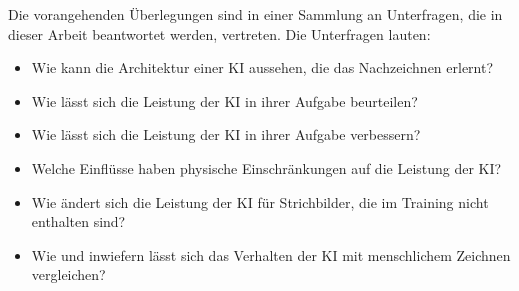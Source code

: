 Die vorangehenden Überlegungen sind in einer Sammlung an Unterfragen, die in
dieser Arbeit beantwortet werden, vertreten. Die Unterfragen lauten:
\begin{itemize}
    \item Wie kann die Architektur einer KI aussehen, die das Nachzeichnen erlernt?
    \item Wie lässt sich die Leistung der KI in ihrer Aufgabe beurteilen?
    \item Wie lässt sich die Leistung der KI in ihrer Aufgabe verbessern?
    \item Welche Einflüsse haben physische Einschränkungen auf die Leistung der KI?
    \item Wie ändert sich die Leistung der KI für Strichbilder, die im Training nicht enthalten sind?
    \item Wie und inwiefern lässt sich das Verhalten der KI mit menschlichem Zeichnen vergleichen?
\end{itemize}


